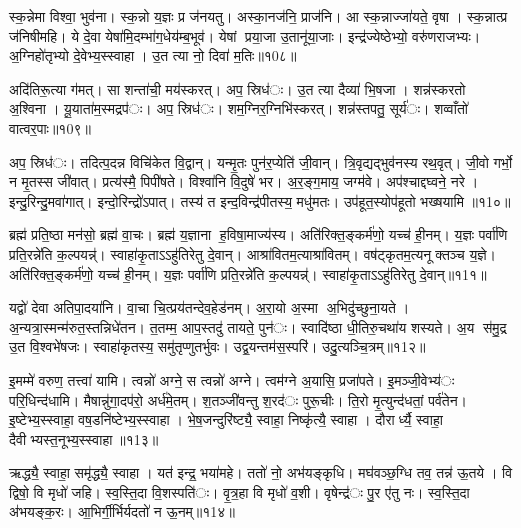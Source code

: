 स्क॒न्नेमा विश्वा॒ भुव॑ना। स्क॒न्नो य॒ज्ञः प्र ज॑नयतु। अस्का॒नज॑नि॒ प्राज॑नि। आ स्क॒न्नाज्जा॑यते॒ वृषा। स्क॒न्नात्प्र ज॑निषीमहि। ये दे॒वा येषा॑मि॒दम्भा॑ग॒धेय॑म्ब॒भूव॑। येषां प्रया॒जा उ॒तानू॑या॒जाः। इन्द्र॑ज्येष्ठेभ्यो॒ वरु॑णराजभ्यः। अ॒ग्निहो॑तृभ्यो दे॒वेभ्य॒स्स्वाहा। उ॒त त्या नो॒ दिवा॑ म॒तिः॥१0८॥

अदि॑तिरू॒त्या ग॑मत्। सा शन्ता॑ची॒ मय॑स्करत्। अप॒ स्रिध॑ः। उ॒त त्या दैव्या॑ भि॒षजा। शन्न॑स्करतो अ॒श्विना। यू॒याता॑म॒स्मद्रप॑ः। अप॒ स्रिध॑ः। शम॒ग्निर॒ग्निभि॑स्करत्। शन्न॑स्तपतु॒ सूर्य॑ः। शव्वाँतो॑ वात्वर॒पाः॥१0९॥

अप॒ स्रिध॑ः। तदित्प॒दन्न विचि॑केत वि॒द्वान्। यन्मृ॒तः पुन॑र॒प्येति॑ जी॒वान्। त्रि॒वृद्यद्भुव॑नस्य रथ॒वृत्। जी॒वो गर्भो॒ न मृ॒तस्स जी॑वात्। प्रत्य॑स्मै॒ पिपी॑षते। विश्वा॑नि वि॒दुषे॑ भर। अ॒र॒ङ्ग॒माय॒ जग्म॑वे। अप॑श्चाद्दघ्वने॒ नरे। इन्दु॒रिन्दु॒मवा॑गात्। इन्दो॒रिन्द्रो॑ऽपात्। तस्य॑ त इन्द॒विन्द्र॑पीतस्य॒ मधु॑मतः। उप॑हूत॒स्योप॑हूतो भख्षयामि ॥१1०॥


ब्रह्म॑ प्रति॒ष्ठा मन॑सो॒ ब्रह्म॑ वा॒चः। ब्रह्म॑ य॒ज्ञाना ह॒विषा॒माज्य॑स्य। अति॑रिक्त॒ङ्कर्म॑णो॒ यच्च॑ ही॒नम्। य॒ज्ञः पर्वा॑णि प्रति॒रन्ने॑ति क॒ल्पयन्न्॑। स्वाहा॑कृ॒ताऽऽहु॑तिरेतु दे॒वान्। आश्रा॑वितम॒त्याश्रा॑वितम्। वष॑ट्कृतम॒त्यनूक्तञ्च य॒ज्ञे। अति॑रिक्त॒ङ्कर्म॑णो॒ यच्च॑ ही॒नम्। य॒ज्ञः पर्वा॑णि प्रति॒रन्ने॑ति क॒ल्पयन्न्॑। स्वाहा॑कृ॒ताऽऽहु॑तिरेतु दे॒वान्॥१1१॥

यद्वो॑ देवा अतिपा॒दया॑नि। वा॒चा चि॒त्प्रय॑तन्देव॒हेड॑नम्। अ॒रा॒यो अ॒स्मा अ॒भिदु॑च्छुना॒यते। अ॒न्यत्रा॒स्मन्म॑रुत॒स्तन्निधे॑तन। त॒तम्म॒ आप॒स्तदु॑ तायते॒ पुन॑ः। स्वादि॑ष्ठा धी॒तिरु॒चथा॑य शस्यते। अ॒य स॑मु॒द्र उ॒त वि॒श्वभे॑षजः। स्वाहा॑कृतस्य॒ समु॑तृप्णुतर्भुवः। उद्व॒यन्तम॑स॒स्परि॑। उदु॒त्यञ्चि॒त्रम्॥१1२॥

इ॒मम्मे॑ वरुण॒ तत्त्वा॑ यामि। त्वन्नो॑ अग्ने॒ स त्वन्नो॑ अग्ने। त्वम॑ग्ने अ॒यासि॒ प्रजा॑पते। इ॒मञ्जी॒वेभ्य॑ः परि॒धिन्द॑धामि। मैषान्नु॑गा॒दप॑रो॒ अर्ध॑मे॒तम्। श॒तञ्जी॑वन्तु श॒रद॑ः पुरू॒चीः। ति॒रो मृ॒त्युन्द॑धतां॒ पर्व॑तेन। इ॒ष्टेभ्य॒स्स्वाहा॒ वष॒डनि॑ष्टेभ्य॒स्स्वाहा। भे॒ष॒जन्दुरि॑ष्ट्यै॒ स्वाहा॒ निष्कृ॑त्यै॒ स्वाहा। दौरार्ध्यै॒ स्वाहा॒ दैवीभ्यस्त॒नूभ्य॒स्स्वाहा॥१1३॥

ऋद्ध्यै॒ स्वाहा॒ समृ॑द्ध्यै॒ स्वाहा। यत॑ इन्द्र॒ भया॑महे। ततो॑ नो॒ अभ॑यङ्कृधि। मघ॑वञ्छ॒ग्धि तव॒ तन्न॑ ऊ॒तये। वि द्विषो॒ वि मृधो॑ जहि। स्व॒स्ति॒दा वि॒शस्पति॑ः। वृ॒त्र॒हा वि मृधो॑ व॒शी। वृषेन्द्र॑ः पु॒र ए॑तु नः। स्व॒स्ति॒दा अ॑भयङ्क॒रः। आ॒भिर्गी॒र्भिर्यदतो॑ न ऊ॒नम्॥१1४॥

